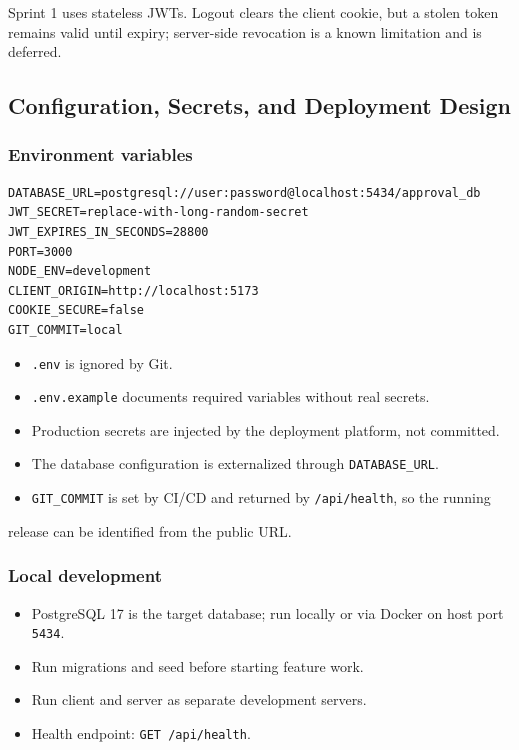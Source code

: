 \documentclass[11pt,a4paper]{article}
\begin{document}
Sprint 1 uses stateless JWTs. Logout clears the client cookie, but a stolen token remains valid until expiry; server-side revocation is a known limitation and is deferred.\\


\subsection{Configuration, Secrets, and Deployment Design}

\subsubsection{Environment variables}

\begin{lstlisting}[basicstyle=\ttfamily\scriptsize]
DATABASE_URL=postgresql://user:password@localhost:5434/approval_db
JWT_SECRET=replace-with-long-random-secret
JWT_EXPIRES_IN_SECONDS=28800
PORT=3000
NODE_ENV=development
CLIENT_ORIGIN=http://localhost:5173
COOKIE_SECURE=false
GIT_COMMIT=local
\end{lstlisting}

\begin{itemize}[leftmargin=*,itemsep=2pt,topsep=2pt]
  \item \texttt{.env} is ignored by Git.
  \item \texttt{.env.example} documents required variables without real secrets.
  \item Production secrets are injected by the deployment platform, not committed.
  \item The database configuration is externalized through \texttt{DATABASE\_URL}.
  \item \texttt{GIT\_COMMIT} is set by CI/CD and returned by \texttt{/api/health}, so the running
\end{itemize}
release can be identified from the public URL.\\

\subsubsection{Local development}

\begin{itemize}[leftmargin=*,itemsep=2pt,topsep=2pt]
  \item PostgreSQL 17 is the target database; run locally or via Docker on host port \texttt{5434}.
  \item Run migrations and seed before starting feature work.
  \item Run client and server as separate development servers.
  \item Health endpoint: \texttt{GET /api/health}.
\end{itemize}
\end{document}
